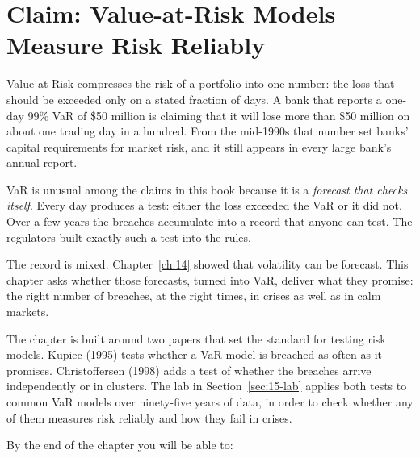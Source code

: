 \makeatletter
{}
\makeatother

\chapter{Claim: Value-at-Risk Models Measure Risk Reliably}
\label{ch:15}

Value at Risk compresses the risk of a portfolio into one number: the loss that should be exceeded only on a stated fraction of days. A bank that reports a one-day 99\% VaR of \$50 million is claiming that it will lose more than \$50 million on about one trading day in a hundred. From the mid-1990s that number set banks' capital requirements for market risk, and it still appears in every large bank's annual report.

VaR is unusual among the claims in this book because it is a \emph{forecast that checks itself}. Every day produces a test: either the loss exceeded the VaR or it did not. Over a few years the breaches accumulate into a record that anyone can test. The regulators built exactly such a test into the rules.

The record is mixed. Chapter~\ref{ch:14} showed that volatility can be forecast. This chapter asks whether those forecasts, turned into VaR, deliver what they promise: the right number of breaches, at the right times, in crises as well as in calm markets.

The chapter is built around two papers that set the standard for testing risk models. Kupiec (1995) tests whether a VaR model is breached as often as it promises. Christoffersen (1998) adds a test of whether the breaches arrive independently or in clusters. The lab in Section~\ref{sec:15-lab} applies both tests to common VaR models over ninety-five years of data, in order to check whether any of them measures risk reliably and how they fail in crises.

By the end of the chapter you will be able to:


